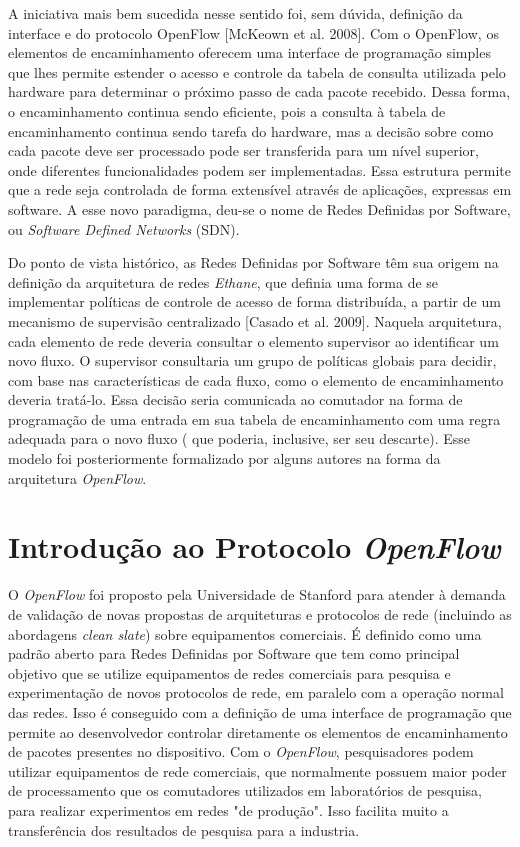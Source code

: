 A iniciativa mais bem sucedida nesse sentido foi, sem dúvida,
definição da interface e do protocolo OpenFlow [McKeown et al.
2008]. Com o OpenFlow, os elementos de encaminhamento 
oferecem uma interface de programação simples que lhes
permite estender o acesso e controle da tabela de consulta 
utilizada pelo hardware para determinar o próximo passo de 
cada pacote recebido. Dessa forma, o encaminhamento continua 
sendo eficiente, pois a consulta à tabela de encaminhamento 
continua sendo tarefa do hardware, mas a decisão sobre 
como cada pacote deve ser processado pode ser transferida
para um nível superior, onde diferentes funcionalidades 
podem ser implementadas. Essa estrutura permite que a rede
seja controlada de forma extensível através de aplicações,
expressas em software. A esse novo paradigma, deu-se o 
nome de Redes Definidas por Software, ou \textit{Software
Defined Networks} (SDN).

Do ponto de vista histórico, as Redes Definidas por 
Software têm sua origem na definição
da arquitetura de redes \textit{Ethane}, que definia uma forma
de se implementar políticas de controle de acesso de forma 
distribuída, a partir de um mecanismo de supervisão centralizado
[Casado et al. 2009]. Naquela arquitetura, cada elemento de 
rede deveria consultar o elemento supervisor ao identificar um
novo fluxo. O supervisor consultaria um grupo de políticas 
globais para decidir, com base nas características de cada
fluxo, como o elemento de encaminhamento deveria 
tratá-lo. Essa decisão seria comunicada ao comutador na 
forma de programação de uma entrada em sua tabela de
encaminhamento com uma regra adequada para o novo fluxo (
que poderia, inclusive, ser seu descarte). Esse modelo foi
posteriormente formalizado por alguns autores na forma da 
arquitetura \textit{OpenFlow}.

\section{Introdução ao Protocolo \textit{OpenFlow}}

O \textit{OpenFlow} foi proposto pela Universidade de
Stanford para atender à demanda de validação de novas
propostas de arquiteturas e protocolos de rede (incluindo as
abordagens \textit{clean slate}) sobre equipamentos
comerciais. É definido como uma padrão aberto para Redes
Definidas por Software que tem como principal objetivo que 
se utilize equipamentos de redes comerciais para pesquisa e 
experimentação de novos protocolos de rede, em paralelo
com a operação normal das redes. Isso é conseguido com a 
definição de uma interface de programação que permite 
ao desenvolvedor controlar diretamente os elementos de 
encaminhamento de pacotes presentes no dispositivo. Com o 
\textit{OpenFlow}, pesquisadores podem utilizar equipamentos de 
rede comerciais, que normalmente possuem maior poder 
de processamento que os comutadores utilizados em 
laboratórios de pesquisa, para realizar experimentos em redes
"de produção". Isso facilita muito a transferência dos resultados
de pesquisa para a industria. 

